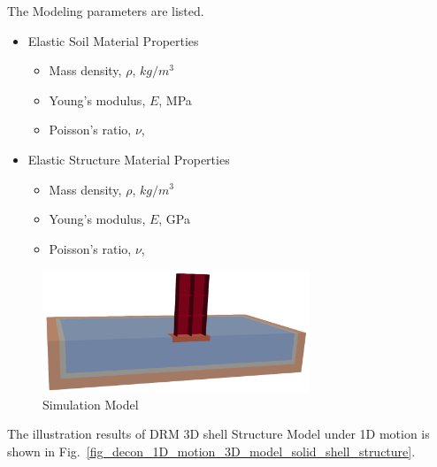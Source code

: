 The Modeling parameters are listed.
\begin{itemize}
  \item Elastic Soil Material Properties 
  \begin{itemize}
    \item Mass density, $\rho$, \enspace {} $kg/m^3$
    \item Young's modulus, $E$, \enspace {} MPa
    \item Poisson's ratio, $\nu$, \enspace {}
  \end{itemize}
  \item Elastic Structure Material Properties 
  \begin{itemize}
    \item Mass density, $\rho$, \enspace {} $kg/m^3$
    \item Young's modulus, $E$, \enspace {} GPa
    \item Poisson's ratio, $\nu$, \enspace {}
  \end{itemize}
\end{itemize}

\begin{figure}[H]
  \centering
  \includegraphics[width = 8cm]{./Figure-files/Day2/Deconvolution_1D_Motions/Shell_Structure_Soil_Interaction_3D_DRM/overview.png}
  \caption{Simulation Model}
  \label{fig_decon_1D_motion_3D_model_shell1}
\end{figure}


The illustration results of DRM 3D shell Structure Model under 1D motion is shown 
in Fig.~\ref{fig_decon_1D_motion_3D_model_solid_shell_structure}. 

